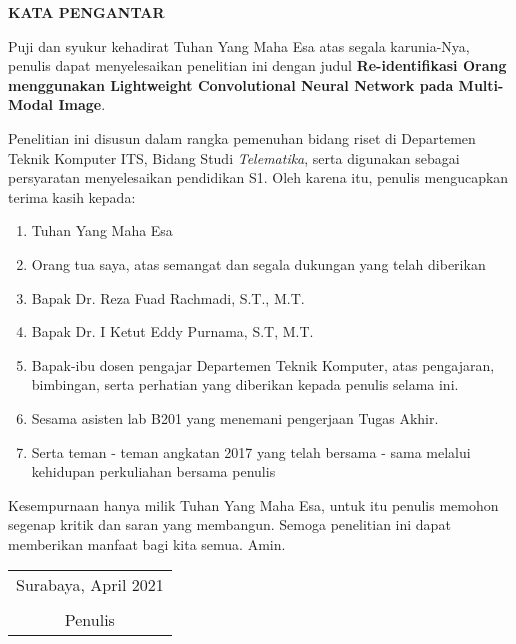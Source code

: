\begin{center}
	\Large\textbf{KATA PENGANTAR}
\end{center}
\vspace{1ex}

\setlength{\parindent}{0.9cm} Puji dan syukur kehadirat Tuhan Yang Maha Esa atas segala karunia-Nya, penulis  dapat menyelesaikan penelitian ini dengan judul \textbf{Re-identifikasi Orang menggunakan Lightweight Convolutional Neural Network pada Multi-Modal Image}.
\vspace{1ex}

Penelitian ini disusun dalam rangka pemenuhan bidang riset di Departemen Teknik Komputer ITS, Bidang Studi \textit{Telematika}, serta digunakan sebagai persyaratan menyelesaikan pendidikan  S1. Oleh karena itu, penulis mengucapkan terima kasih kepada:
\vspace{1ex}

\begin{enumerate}[nolistsep]
	\item Tuhan Yang Maha Esa
	\item Orang tua saya, atas semangat dan segala dukungan yang telah diberikan
	\item Bapak Dr. Reza Fuad Rachmadi, S.T., M.T.
	\item Bapak Dr. I Ketut Eddy Purnama, S.T, M.T.
	\item Bapak-ibu dosen pengajar Departemen Teknik Komputer, atas pengajaran, bimbingan, serta perhatian yang diberikan kepada penulis selama ini.
	\item Sesama asisten lab B201 yang menemani pengerjaan Tugas Akhir.
	\item Serta teman - teman angkatan 2017 yang telah bersama - sama melalui kehidupan perkuliahan bersama penulis
\end{enumerate}
\vspace{1ex}

Kesempurnaan hanya milik Tuhan Yang Maha Esa, untuk itu penulis memohon segenap kritik dan saran yang  membangun. Semoga penelitian ini dapat memberikan manfaat bagi kita semua. Amin.
\begin{flushright}
	\begin{tabular}[b]{c}
		Surabaya, April 2021
		\\
		\\
		Penulis
	\end{tabular}
\end{flushright}